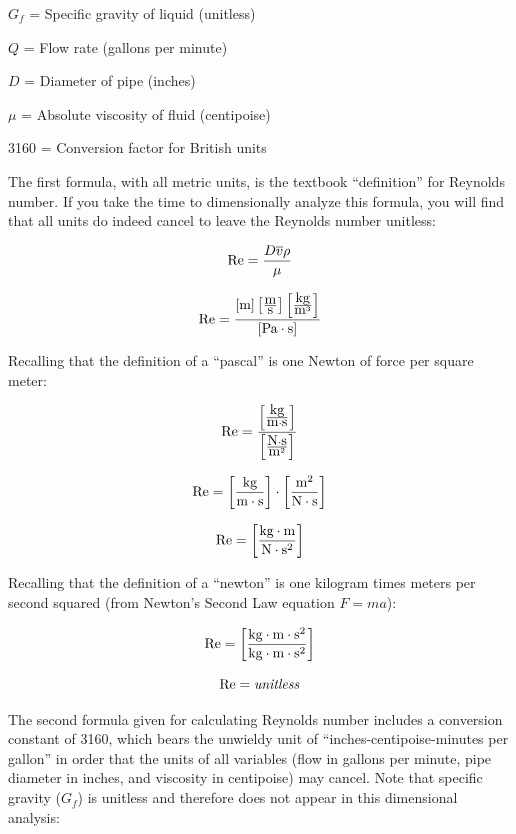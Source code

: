 $G_f$ = Specific gravity of liquid (unitless)

$Q$ = Flow rate (gallons per minute)

$D$ = Diameter of pipe (inches)

$\mu$ = Absolute viscosity of fluid (centipoise)

3160 = Conversion factor for British units

\vskip 10pt

\filbreak

The first formula, with all metric units, is the textbook ``definition'' for Reynolds number.  If you take the time to dimensionally analyze this formula, you will find that all units do indeed cancel to leave the Reynolds number unitless:

$$\hbox{Re} = {{D \overline{v} \rho} \over \mu}$$

$$\hbox{Re} = {{[\hbox{m}] \left[{\hbox{m} \over \hbox{s}}\right] \left[{\hbox{kg} \over \hbox{m}^3}\right] \over {[\hbox{Pa} \cdot \hbox{s}]}}}$$

Recalling that the definition of a ``pascal'' is one Newton of force per square meter:

$$\hbox{Re} = {\left[{\hbox{kg} \over {\hbox{m} \cdot \hbox{s}}}\right] \over \left[{\hbox{N} \cdot \hbox{s} \over \hbox{m}^2}\right]}$$

$$\hbox{Re} = {\left[{\hbox{kg} \over {\hbox{m} \cdot \hbox{s}}}\right] \cdot \left[{\hbox{m}^2 \over \hbox{N} \cdot \hbox{s}}\right]}$$

$$\hbox{Re} = \left[{{\hbox{kg} \cdot \hbox{m}} \over {\hbox{N} \cdot \hbox{s}^2}}\right]$$

Recalling that the definition of a ``newton'' is one kilogram times meters per second squared (from Newton's Second Law equation $F = ma$):

$$\hbox{Re} = \left[{{\hbox{kg} \cdot \hbox{m} \cdot \hbox{s}^2} \over {\hbox{kg} \cdot \hbox{m} \cdot \hbox{s}^2}}\right]$$

$$\hbox{Re} = \hbox{\textit{unitless}}$$

\filbreak

The second formula given for calculating Reynolds number includes a conversion constant of 3160, which bears the unwieldy unit of ``inches-centipoise-minutes per gallon'' in order that the units of all variables (flow in gallons per minute, pipe diameter in inches, and viscosity in centipoise) may cancel.  Note that specific gravity ($G_f$) is unitless and therefore does not appear in this dimensional analysis:  

